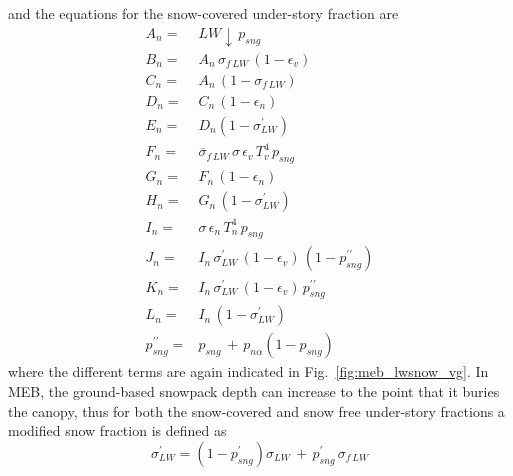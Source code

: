 %
and the equations for the snow-covered under-story fraction are
%
\begin{subequations}\label{eq:meb_lw_n_n_terms}
\begin{align}
 \label{eq:meb_lw_n_n_terms_a}
A_{n} = & LW\downarrow \,p_{sng}
\\
 \label{eq:meb_lw_n_n_terms_b}
B_{n} = & A_{n}\,\sigma_{f\,LW}\,\left(1-\epsilon_v\right)
\\
 \label{eq:meb_lw_n_n_terms_c}
C_{n} = & A_{n}\,\left(1-\sigma_{f\,LW}\right)
\\
 \label{eq:meb_lw_n_n_terms_d}
D_{n} = & C_{n} \,\left(1-\epsilon_n\right)
\\
 \label{eq:meb_lw_n_n_terms_e}
E_{n} = & D_{n}\left(1-\sigma_{LW}^\prime\right)
\\
 \label{eq:meb_lw_n_n_terms_f}
F_{n} = & {\overline\sigma}_{f\,LW}\, \sigma \, \epsilon_v\, T_v^4\,p_{sng}
\\
 \label{eq:meb_lw_n_n_terms_g}
G_{n} = & F_{n}\,\left(1-\epsilon_n\right)
\\
 \label{eq:meb_lw_n_n_terms_h}
H_{n} = & G_{n}\,\left(1-\sigma_{LW}^\prime\right)
\\
 \label{eq:meb_lw_n_n_terms_i}
I_{n} = & \sigma \, \epsilon_n\, T_n^4\,p_{sng}
\\
 \label{eq:meb_lw_n_n_terms_j}
J_{n} = & I_{n}\,\sigma_{LW}^\prime\,\left(1-\epsilon_v\right) \,\left(1-p_{sng}^{\prime\prime}\right)
\\
 \label{eq:meb_lw_n_n_terms_k}
K_{n} = & I_{n}\,\sigma_{LW}^\prime\,\left(1-\epsilon_v\right) \, p_{sng}^{\prime\prime}
\\
 \label{eq:meb_lw_n_n_terms_l}
L_{n} = & I_{n}\,\left(1-\sigma_{LW}^\prime\right)
%
\\
 \label{eq:meb_lw_n_n_terms_png}
p_{sng}^{\prime\prime} = & p_{sng} \,+\, p_{n\alpha}\left(1-p_{sng}\right)
%
\end{align}
\end{subequations}
%
where the different terms are again
indicated in Fig.~\ref{fig:meb_lwsnow_vg}.
%
In MEB, the ground-based snowpack depth can increase to the point that
it buries the canopy, thus
for both the snow-covered and snow free under-story fractions 
a modified snow fraction is defined as
%
\begin{equation}
\label{eq:meb_sigma_lw_avg}
%
\sigma_{LW}^\prime = \left(1-p_{sng}^\prime\right)\sigma_{LW} \,+\,
p_{sng}^\prime \,\sigma_{f\,LW}
%
\end{equation}
